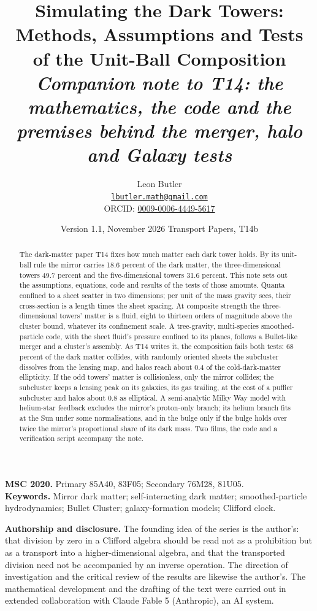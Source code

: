 \documentclass[11pt]{article}
\title{\bfseries Simulating the Dark Towers:\\ Methods, Assumptions and Tests of the Unit-Ball Composition\\[4pt]
  \large\itshape Companion note to T14: the mathematics, the code and the premises behind the merger, halo and Galaxy tests}
\author{Leon Butler\\ \normalsize\href{mailto:lbutler.math@gmail.com}{\texttt{lbutler.math@gmail.com}}\\ \normalsize ORCID: \href{https://orcid.org/0009-0006-4449-5617}{0009-0006-4449-5617}}
\date{Version 1.1, November 2026 \textperiodcentered{} Transport Papers, T14b}
\theoremstyle{definition}
\begin{document}
\maketitle

\begin{abstract}
\normalsize
The dark-matter paper T14 fixes how much matter each dark tower holds. By its unit-ball rule the mirror carries 18.6 percent of the dark matter, the three-dimensional towers 49.7 percent and the five-dimensional towers 31.6 percent. This note sets out the assumptions, equations, code and results of the tests of those amounts. Quanta confined to a sheet scatter in two dimensions; per unit of the mass gravity sees, their cross-section is a length times the sheet spacing. At composite strength the three-dimensional towers' matter is a fluid, eight to thirteen orders of magnitude above the cluster bound, whatever its confinement scale. A tree-gravity, multi-species smoothed-particle code, with the sheet fluid's pressure confined to its planes, follows a Bullet-like merger and a cluster's assembly. As T14 writes it, the composition fails both tests: 68 percent of the dark matter collides, with randomly oriented sheets the subcluster dissolves from the lensing map, and halos reach about 0.4 of the cold-dark-matter ellipticity. If the odd towers' matter is collisionless, only the mirror collides; the subcluster keeps a lensing peak on its galaxies, its gas trailing, at the cost of a puffier subcluster and halos about 0.8 as elliptical. A semi-analytic Milky Way model with helium-star feedback excludes the mirror's proton-only branch; its helium branch fits at the Sun under some normalisations, and in the bulge only if the bulge holds over twice the mirror's proportional share of its dark mass. Two films, the code and a verification script accompany the note.
\end{abstract}

\medskip
\noindent\textbf{MSC 2020.} Primary 85A40, 83F05; Secondary 76M28, 81U05.\\
\textbf{Keywords.} Mirror dark matter; self-interacting dark matter; smoothed-particle hydrodynamics; Bullet Cluster; galaxy-formation models; Clifford clock.

\newpage
\textbf{Authorship and disclosure. }The founding idea of the series is the author's: that division by zero in a Clifford algebra should be read not as a prohibition but as a transport into a higher-dimensional algebra, and that the transported division need not be accompanied by an inverse operation. The direction of investigation and the critical review of the results are likewise the author's. The mathematical development and the drafting of the text were carried out in extended collaboration with Claude Fable 5 (Anthropic), an AI system.
\end{document}
